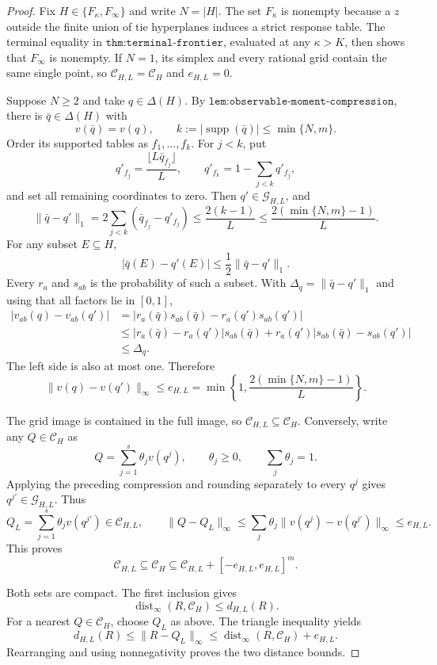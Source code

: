 \documentclass{article}
\begin{document}
\begin{proof}
Fix \(H\in\{F_\kappa,F_\infty\}\) and write \(N=|H|\).  The set \(F_\kappa\) is nonempty because a \(z\) outside the finite union of tie hyperplanes induces a strict response table.  The terminal equality in \(\texttt{thm:terminal-frontier}\), evaluated at any \(\kappa>K\), then shows that \(F_\infty\) is nonempty.  If \(N=1\), its simplex and every rational grid contain the same single point, so \(\mathcal C_{H,L}=\mathcal C_H\) and \(e_{H,L}=0\).

Suppose \(N\ge2\) and take \(q\in\Delta(H)\).  By \(\texttt{lem:observable-moment-compression}\), there is \(\bar q\in\Delta(H)\) with
\[
 v(\bar q)=v(q),
 \qquad
 k:=|\operatorname{supp}(\bar q)|
 \le\min\{N,m\}.
\]
Order its supported tables as \(f_1,\ldots,f_k\).  For \(j<k\), put
\[
 q'_{f_j}=\frac{\lfloor L\bar q_{f_j}\rfloor}{L},
 \qquad
 q'_{f_k}=1-\sum_{j<k}q'_{f_j},
\]
and set all remaining coordinates to zero.  Then \(q'\in\mathcal G_{H,L}\), and
\[
 \|\bar q-q'\|_1
 =2\sum_{j<k}\left(\bar q_{f_j}-q'_{f_j}\right)
 \le\frac{2(k-1)}{L}
 \le\frac{2(\min\{N,m\}-1)}{L}.
\]
For any subset \(E\subseteq H\),
\[
 |\bar q(E)-q'(E)|
 \le\frac12\|\bar q-q'\|_1.
\]
Every \(r_a\) and \(s_{ab}\) is the probability of such a subset.  With \(\Delta_q=\|\bar q-q'\|_1\) and using that all factors lie in \([0,1]\),
\[
 \begin{aligned}
 |v_{ab}(q)-v_{ab}(q')|
 &=|r_a(\bar q)s_{ab}(\bar q)-r_a(q')s_{ab}(q')|\\
 &\le |r_a(\bar q)-r_a(q')|s_{ab}(\bar q)
      +r_a(q')|s_{ab}(\bar q)-s_{ab}(q')|\\
 &\le\Delta_q.
 \end{aligned}
\]
The left side is also at most one.  Therefore
\[
 \|v(q)-v(q')\|_\infty
 \le e_{H,L}
 =\min\left\{1,\frac{2(\min\{N,m\}-1)}{L}\right\}.
\]

The grid image is contained in the full image, so \(\mathcal C_{H,L}\subseteq\mathcal C_H\).  Conversely, write any \(Q\in\mathcal C_H\) as
\[
 Q=\sum_{j=1}^{s}\theta_jv(q^j),
 \qquad \theta_j\ge0,
 \qquad \sum_j\theta_j=1.
\]
Applying the preceding compression and rounding separately to every \(q^j\) gives \(q^{j\prime}\in\mathcal G_{H,L}\).  Thus
\[
 Q_L=\sum_{j=1}^{s}\theta_jv(q^{j\prime})\in\mathcal C_{H,L},
 \qquad
 \|Q-Q_L\|_\infty
 \le\sum_j\theta_j\|v(q^j)-v(q^{j\prime})\|_\infty
 \le e_{H,L}.
\]
This proves
\[
 \mathcal C_{H,L}\subseteq\mathcal C_H
 \subseteq\mathcal C_{H,L}+[-e_{H,L},e_{H,L}]^m.
\]

Both sets are compact.  The first inclusion gives
\[
 \operatorname{dist}_\infty(R,\mathcal C_H)\le d_{H,L}(R).
\]
For a nearest \(Q\in\mathcal C_H\), choose \(Q_L\) as above.  The triangle inequality yields
\[
 d_{H,L}(R)
 \le\|R-Q_L\|_\infty
 \le\operatorname{dist}_\infty(R,\mathcal C_H)+e_{H,L}.
\]
Rearranging and using nonnegativity proves the two distance bounds.


\end{proof}
\end{document}

